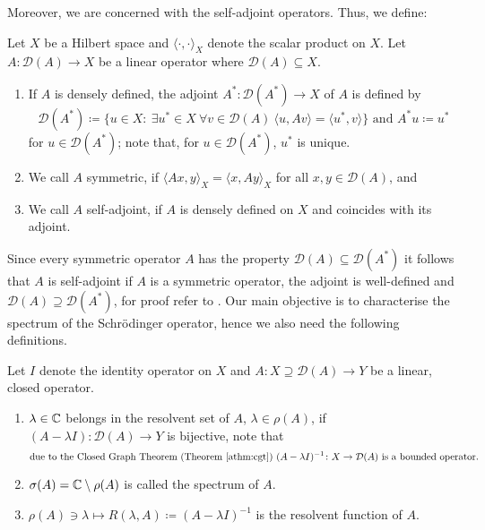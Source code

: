 Moreover, we are concerned with the self-adjoint operators. Thus, we define:

\begin{definition}
Let $X$ be a Hilbert space and $\langle \cdot, \cdot \rangle_{X}$ denote the scalar product on $X$. Let $A \colon \mathcal{D}(A) \rightarrow X$ be a linear operator where $\mathcal{D}(A) \subseteq X$.
	\begin{enumerate}[label=\alph*\upshape)]
		\item If $A$ is densely defined, the adjoint $A^{*} \colon \mathcal{D}(A^{*}) \rightarrow X$ of $A$ is defined by 
		\[ \mathcal{D}(A^{*}) \coloneqq \{ u \in X \colon ~\exists u^{*} \in X ~\forall v \in \mathcal{D}(A) ~\langle u, Av \rangle = \langle u^{*} , v \rangle \} \text{ and } A^{*} u \coloneqq u^{*} \] for $u \in \mathcal{D}(A^{*})$; note that, for $u \in \mathcal{D}(A^{*})$, $u^{*}$ is unique.
		\item We call $A$ symmetric, if $\langle Ax,y \rangle_{X} = \langle x , Ay \rangle_{X}$ for all $x,y \in \mathcal{D}(A)$, and
		\item We call $A$ self-adjoint, if $A$ is densely defined on $X$ and coincides with its adjoint.
	\end{enumerate}
\end{definition}

Since every symmetric operator $A$ has the property $\mathcal{D}(A) \subseteq \mathcal{D}(A^{*})$ it follows that $A$ is self-adjoint if $A$ is a symmetric operator, the adjoint is well-defined and $\mathcal{D}(A) \supseteq \mathcal{D}(A^{*})$, for proof refer to \cite[p. 256]{reed1908methods}. Our main objective is to characterise the spectrum of the Schrödinger operator, hence we also need the following definitions.

\begin{definition}
Let $I$ denote the identity operator on $X$ and $A \colon X \supseteq \mathcal{D}(A) \rightarrow Y$ be a linear, closed operator.
	\begin{enumerate}[label=\alph*\upshape)]
		\item $\lambda \in \mathbb{C}$ belongs in the resolvent set of $A$, $\lambda \in \rho(A)$, if $(A  - \lambda I) \colon \mathcal{D}(A) \rightarrow Y$ is bijective, note that
			\[ \text{due to the Closed Graph Theorem (Theorem \ref{athm:cgt}) } (A - \lambda I)^{-1} \colon X \rightarrow \mathcal{D}(A) \text{ is a bounded operator.} \]
		\item $\sigma(A) = \mathbb{C} \setminus \rho(A)$ is called the spectrum of $A$. 
		\item $\rho(A) \ni \lambda \mapsto R(\lambda, A) \coloneqq (A - \lambda I)^{-1}$ is the resolvent function of $A$.
	\end{enumerate}		
\end{definition}

